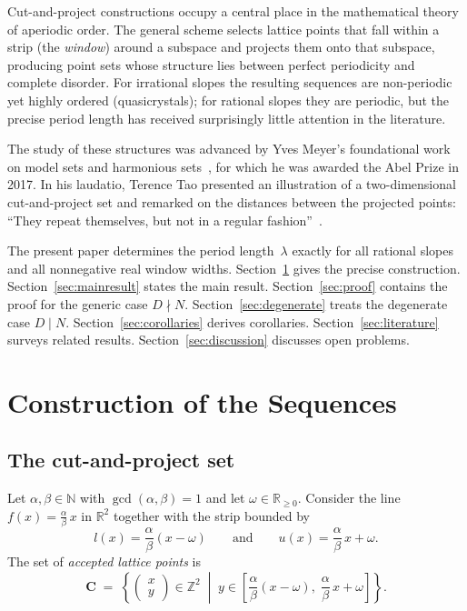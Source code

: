 \documentclass[11pt]{article}
\theoremstyle{plain}
\theoremstyle{definition}
\theoremstyle{remark}
\begin{document}
Cut-and-project constructions occupy a central place in the mathematical
theory of aperiodic order.  The general scheme selects lattice points that
fall within a strip (the \emph{window}) around a subspace and projects them
onto that subspace, producing point sets whose structure lies between perfect
periodicity and complete disorder.  For irrational slopes the resulting
sequences are non-periodic yet highly ordered (quasicrystals); for rational
slopes they are periodic, but the precise period length has received
surprisingly little attention in the literature.

The study of these structures was advanced by Yves Meyer's foundational work
on model sets and harmonious sets~\cite{Meyer1972}, for which he was awarded
the Abel Prize in 2017.  In his laudatio, Terence Tao presented an
illustration of a two-dimensional cut-and-project set and remarked on the
distances between the projected points: ``They repeat themselves, but not in
a regular fashion''~\cite{SpeechTao}.

The present paper determines the period length~$\lambda$ exactly for all
rational slopes and all nonnegative real window widths.
Section~\ref{sec:setup} gives the precise construction.
Section~\ref{sec:mainresult} states the main result.
Section~\ref{sec:proof} contains the proof for the generic case $D \nmid N$.
Section~\ref{sec:degenerate} treats the degenerate case $D \mid N$.
Section~\ref{sec:corollaries} derives corollaries.
Section~\ref{sec:literature} surveys related results.
Section~\ref{sec:discussion} discusses open problems.

\section{Construction of the Sequences}\label{sec:setup}

\subsection{The cut-and-project set}\label{subsec:construction}

Let $\alpha, \beta \in \mathbb{N}$ with $\gcd(\alpha, \beta) = 1$ and let
$\omega \in \mathbb{R}_{\ge 0}$.
Consider the line $f(x) = \frac{\alpha}{\beta}\,x$ in $\mathbb{R}^2$ together
with the strip bounded by
\[
    l(x) = \frac{\alpha}{\beta}(x - \omega)
    \qquad\text{and}\qquad
    u(x) = \frac{\alpha}{\beta}\,x + \omega.
\]
The set of \emph{accepted lattice points} is
\begin{equation}\label{eq:points}
    \mathbf{C} \;=\; \left\{
    \begin{pmatrix} x \\ y \end{pmatrix} \in \mathbb{Z}^2
    \;\middle|\;
    y \in
    \left[\frac{\alpha}{\beta}(x - \omega),\;
          \frac{\alpha}{\beta}\,x + \omega\right]
    \right\}.
\end{equation}
\end{document}
